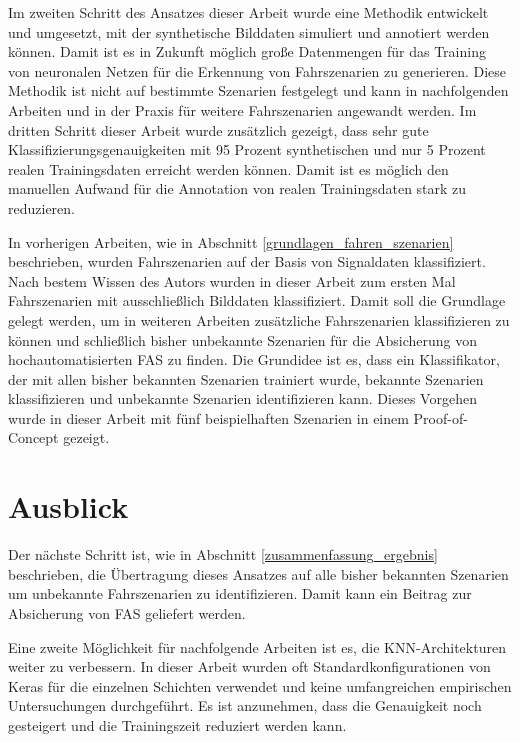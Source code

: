 Im zweiten Schritt des Ansatzes dieser Arbeit wurde eine Methodik entwickelt und umgesetzt, mit der synthetische Bilddaten simuliert und annotiert werden können. Damit ist es in Zukunft möglich große Datenmengen für das Training von neuronalen Netzen für die Erkennung von Fahrszenarien zu generieren. Diese Methodik ist nicht auf bestimmte Szenarien festgelegt und kann in nachfolgenden Arbeiten und in der Praxis für weitere Fahrszenarien angewandt werden. Im dritten Schritt dieser Arbeit wurde zusätzlich gezeigt, dass sehr gute Klassifizierungsgenauigkeiten mit 95 Prozent synthetischen und nur 5 Prozent realen Trainingsdaten erreicht werden können. Damit ist es möglich den manuellen Aufwand für die Annotation von realen Trainingsdaten stark zu reduzieren.

In vorherigen Arbeiten, wie in Abschnitt \ref{grundlagen_fahren_szenarien} beschrieben, wurden Fahrszenarien auf der Basis von Signaldaten klassifiziert. Nach bestem Wissen des Autors wurden in dieser Arbeit zum ersten Mal Fahrszenarien mit ausschließlich Bilddaten klassifiziert. Damit soll die Grundlage gelegt werden, um in weiteren Arbeiten zusätzliche Fahrszenarien klassifizieren zu können und schließlich bisher unbekannte Szenarien für die Absicherung von hochautomatisierten \ac{FAS} zu finden. Die Grundidee ist es, dass ein Klassifikator, der mit allen bisher bekannten Szenarien trainiert wurde, bekannte Szenarien klassifizieren und unbekannte Szenarien identifizieren kann. Dieses Vorgehen wurde in dieser Arbeit mit fünf beispielhaften Szenarien in einem Proof-of-Concept gezeigt.
 
 \section{Ausblick}
 \label{zusammenfassung_ausblick}

Der nächste Schritt ist, wie in Abschnitt \ref{zusammenfassung_ergebnis} beschrieben, die Übertragung dieses Ansatzes auf alle bisher bekannten Szenarien um unbekannte Fahrszenarien zu identifizieren. Damit kann ein Beitrag zur Absicherung von \ac{FAS} geliefert werden.

Eine zweite Möglichkeit für nachfolgende Arbeiten ist es, die \ac{KNN}-Architekturen weiter zu verbessern. In dieser Arbeit wurden oft Standardkonfigurationen von Keras \cite{chollet2015keras} für die einzelnen Schichten verwendet und keine umfangreichen empirischen Untersuchungen durchgeführt. Es ist anzunehmen, dass die Genauigkeit noch gesteigert und die Trainingszeit reduziert werden kann.

